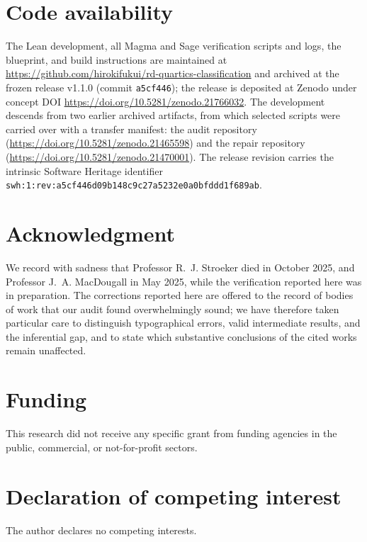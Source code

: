 \documentclass[11pt]{amsart}
\newcommand{\repourl}{https://github.com/hirokifukui/rd-quartics-classification}
\newcommand{\repotag}{v1.1.0}
\newcommand{\repocommit}{a5cf446}
\newcommand{\conceptdoi}{10.5281/zenodo.21766032}
\begin{document}
\section*{Code availability}
{\sloppy
The Lean development, all Magma and Sage verification scripts and logs,
the blueprint, and build instructions are maintained at \url{\repourl}
and archived at the frozen release \repotag{} (commit
\texttt{\repocommit}); the release is deposited at Zenodo under concept
DOI \url{https://doi.org/\conceptdoi}.  The development descends from two earlier
archived artifacts, from which selected scripts were carried over with
a transfer manifest: the audit repository
(\url{https://doi.org/10.5281/zenodo.21465598}) and the repair
repository (\url{https://doi.org/10.5281/zenodo.21470001}).
The release revision carries the intrinsic Software Heritage identifier
\texttt{swh:1:rev:a5cf446d09b148c9c27a5232e0a0bfddd1f689ab}.
\par}

\section*{Acknowledgment}
We record with sadness that Professor R.~J. Stroeker died in October
2025, and Professor J.~A. MacDougall in May 2025, while the
verification reported here was in preparation.  The corrections
reported here are offered to the record of bodies of work that our
audit found overwhelmingly sound; we have therefore taken particular
care to distinguish typographical errors, valid intermediate results,
and the inferential gap, and to state which substantive conclusions of
the cited works remain unaffected.

\section*{Funding}
This research did not receive any specific grant from funding agencies
in the public, commercial, or not-for-profit sectors.

\section*{Declaration of competing interest}
The author declares no competing interests.

\end{document}
